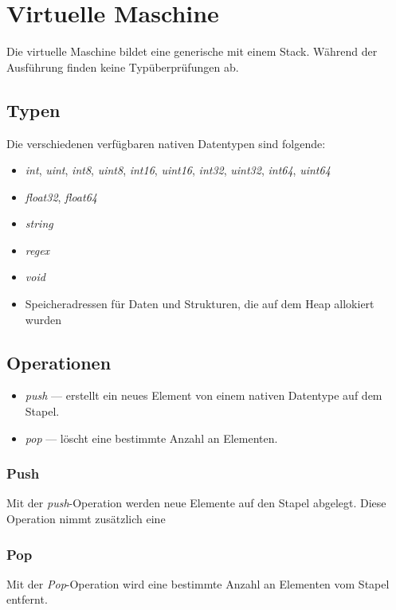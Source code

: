 \chapter{Virtuelle Maschine}
Die virtuelle Maschine bildet eine generische mit einem Stack. Während der Ausführung finden keine Typüberprüfungen ab.

\section{Typen}
Die verschiedenen verfügbaren nativen Datentypen sind folgende:
\begin{itemize}
\item \textit{int}, \textit{uint}, \textit{int8}, \textit{uint8}, \textit{int16}, \textit{uint16}, \textit{int32}, \textit{uint32}, \textit{int64}, \textit{uint64}
\item \textit{float32}, \textit{float64}
\item \textit{string}
\item \textit{regex}
\item \textit{void}
\item Speicheradressen für Daten und Strukturen, die auf dem Heap allokiert wurden
\end{itemize}

\section{Operationen}
\begin{itemize}
\item \textit{push} --- erstellt ein neues Element von einem nativen Datentype auf dem Stapel.
\item \textit{pop} --- löscht eine bestimmte Anzahl an Elementen.
\end{itemize}

\subsection{Push}
Mit der \textit{push}-Operation werden neue Elemente auf den Stapel abgelegt. Diese Operation nimmt zusätzlich eine 

\subsection{Pop}
Mit der \textit{Pop}-Operation wird eine bestimmte Anzahl an Elementen vom Stapel entfernt.



